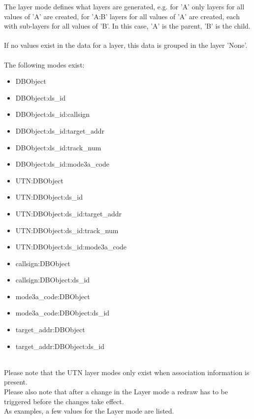 The layer mode defines what layers are generated, e.g. for 'A' only layers for all values of 'A' are created, for 'A:B' layers for all values of 'A' are created, each with sub-layers for all values of 'B'. In this case, 'A' is the parent, 'B' is the child. \\\\

If no values exist in the data for a layer, this data is grouped in the layer 'None'.\\\\

The following modes exist: \\

\begin{itemize}
 \item DBObject
 \item DBObject:ds\_id
 \item DBObject:ds\_id:callsign
 \item DBObject:ds\_id:target\_addr
 \item DBObject:ds\_id:track\_num
 \item DBObject:ds\_id:mode3a\_code
 \item UTN:DBObject
 \item UTN:DBObject:ds\_id
 \item UTN:DBObject:ds\_id:target\_addr
 \item UTN:DBObject:ds\_id:track\_num
 \item UTN:DBObject:ds\_id:mode3a\_code
 \item callsign:DBObject
 \item callsign:DBObject:ds\_id 
 \item mode3a\_code:DBObject
 \item mode3a\_code:DBObject:ds\_id
 \item target\_addr:DBObject
 \item target\_addr:DBObject:ds\_id
\end{itemize}
\  \\

Please note that the UTN layer modes only exist when association information is present. \\

Please also note that after a change in the Layer mode a redraw has to be triggered before the changes take effect. \\

As examples, a few values for the Layer mode are listed. \\

